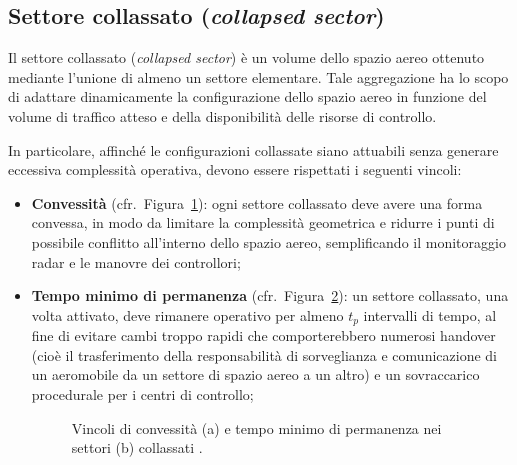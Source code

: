 \subsection{Settore collassato (\emph{collapsed sector})}
\label{subsec:settore-collassato}

Il settore collassato (\emph{collapsed sector}) è un volume dello spazio aereo ottenuto mediante l’unione di almeno un settore elementare. Tale aggregazione ha lo scopo di adattare dinamicamente la configurazione dello spazio aereo in funzione del volume di traffico atteso e della disponibilità delle risorse di controllo.

In particolare, affinché le configurazioni collassate siano attuabili senza generare eccessiva complessità operativa, devono essere rispettati i seguenti vincoli:
\DisablePunct
\begin{itemize}
  \item {\bf Convessità} (cfr.~Figura~\ref{fig:convexity}): ogni settore collassato deve avere una forma convessa, in modo da limitare la complessità geometrica e ridurre i punti di possibile conflitto all’interno dello spazio aereo, semplificando il monitoraggio radar e le manovre dei controllori;
  \item {\bf Tempo minimo di permanenza} (cfr.~Figura~\ref{fig:minstay}): un settore collassato, una volta attivato, deve rimanere operativo per almeno \(t_p\) intervalli di tempo, al fine di evitare cambi troppo rapidi che comporterebbero numerosi handover (cioè il trasferimento della responsabilità di sorveglianza e comunicazione di un aeromobile da un settore di spazio aereo a un altro) e un sovraccarico procedurale per i centri di controllo;
 \clearpage
  \begin{figure}[H]
    \centering
    \begin{subfigure}[b]{0.45\textwidth}
      \centering
      
      \label{fig:convexity}
    \end{subfigure}\hfill
    \begin{subfigure}[b]{0.45\textwidth}
      \centering
      
      \label{fig:minstay}
    \end{subfigure}
    \caption{Vincoli di convessità (a) e tempo minimo di permanenza nei settori (b) collassati \cite{treimuth2018dynamic}.}
    \label{fig:constraints_ab}
  \end{figure}


\end{itemize}
